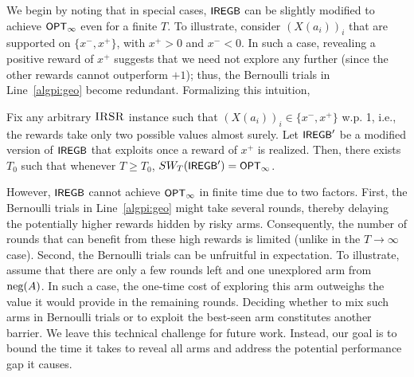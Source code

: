 We begin by noting that in special cases, ${\small\textnormal{\textsf{IREGB}}}$ can be slightly modified to achieve ${\small\textnormal{\textsf{OPT}}}_\infty$ even for a finite $T$. To illustrate, consider $(X(a_i))_i$ that are supported on $\{x^-,x^+\}$, with $x^+>0$ and $x^- <0$. In such a case, revealing a positive reward of $x^+$ suggests that we need not explore any further (since the other rewards cannot outperform $+1$); thus, the Bernoulli trials in Line~\ref{algpi:geo} become redundant. Formalizing this intuition,
\begin{proposition}\label{prop:bernoulli opt}
Fix any arbitrary $\textsc{IRSR}$ instance such that $(X(a_i))_i \in \{x^-,x^+\}$ w.p. 1, i.e., the rewards take only two possible values almost surely. Let ${\small\textnormal{\textsf{IREGB}}}'$ be a modified version of ${\small\textnormal{\textsf{IREGB}}}$ that exploits once a reward of $x^+$ is realized. Then, there exists $T_0$ such that whenever $T\geq T_0$, $SW_T({\small\textnormal{\textsf{IREGB}}}') ={\small\textnormal{\textsf{OPT}}}_\infty$.
\end{proposition}
However, ${\small\textnormal{\textsf{IREGB}}}$ cannot achieve ${\small\textnormal{\textsf{OPT}}}_\infty$ in finite time due to two factors. First, the Bernoulli trials in Line~\ref{algpi:geo} might take several rounds, thereby delaying the potentially higher rewards hidden by risky arms. Consequently, the number of rounds that can benefit from these high rewards is limited (unlike in the $T\rightarrow\infty$ case). Second, the Bernoulli trials can be unfruitful in expectation. To illustrate, assume that there are only a few rounds left and one unexplored arm from $\textnormal{neg}(A)$. In such a case, the one-time cost of exploring this arm outweighs the value it would provide in the remaining rounds. Deciding whether to mix such arms in Bernoulli trials or to exploit the best-seen arm constitutes another barrier. We leave this technical challenge for future work. Instead, our goal is to bound the time it takes to reveal all arms and address the potential performance gap it causes. 

